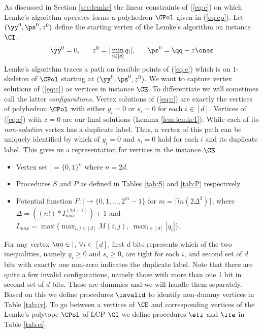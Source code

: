 As discussed in Section \ref{sec:lemke} the linear constraints of (\ref{eq:c}) on which Lemke's algorithm operates forms a polyhedron $\CPol$ given in (\ref{eq:cp}). %
Let $(\yy^0,\ps^0,z^0)$ define the starting vertex of the Lemke's algorithm on instance $\CI$. 
\begin{equation}\label{eq:v0}
\yy^0=0,\ \ \ \ \ z^0= |\min_{i \in [d]} q_i|,\ \ \ \ \  \ps^0=\qq-z\ones
\end{equation}
Lemke's algorithm traces a path on feasible points of (\ref{eq:c}) which is on $1$-skeleton of $\CPol$ starting at $(\yy^0,\ps^0,z^0)$. We want to capture vertex solutions of (\ref{eq:c}) as vertices in \EOPL instance $\CE$. To differentiate we will sometimes call the latter {\em configurations}. Vertex solutions of (\ref{eq:c}) are exactly the vertices of polyhedron $\CPol$ with either $y_i=0$ or $s_i=0$ for each $i\in [d]$. Vertices of (\ref{eq:c}) with $z=0$ are our final solutions (Lemma \ref{lem:lemke1}). While each of its {\em non-solution} vertex has a duplicate label. Thus, a vertex of this path can be uniquely identified by which of $y_i=0$ and $s_i=0$ hold for each $i$ and its duplicate label. This gives us a representation for vertices in the \EOPL instance $\CE$. 
\medskip


\begin{itemize}
\item Vertex set $\vert=\{0,1\}^n$ where $n = 2d$. 
\item Procedures $S$ and $P$ as defined in Tables \ref{tab:S} and \ref{tab:P} respectively
\item Potential function $F:\vert \rightarrow \{0,1,\dots, 2^m-1\}$ for $m=\lceil ln(2\Delta^3)\rceil$, where $\Delta=((n!)* I_{max}^{(2d+1)})+1$ and $I_{max} = \max\{\max_{i,j\in [d]} M(i,j),\ \max_{i\in [d]} |q_i|\}$. 
\end{itemize}

For any vertex $\uu\in \vert$, $\forall i \in [d]$, first $d$ bits represents
which of the two inequalities, namely $y_i\ge 0$ and $s_i\ge 0$, are tight for
each $i$, and second set of $d$ bits with exactly one non-zero indicates the
duplicate label. Note that there are quite a few invalid configurations, namely
those with more than one 1 bit in second set of $d$ bits. These are dummies and
we will handle them separately. Based on this we define procedures $\isvalid$
to identify non-dummy vertices in Table \ref{tab:iv}. To go between a vertices
of $\CE$ and corresponding vertices of the Lemke's polytope $\CPol$ of LCP
$\CI$ we define procedures $\eti$ and $\ite$ in Table \ref{tab:ei}.  

